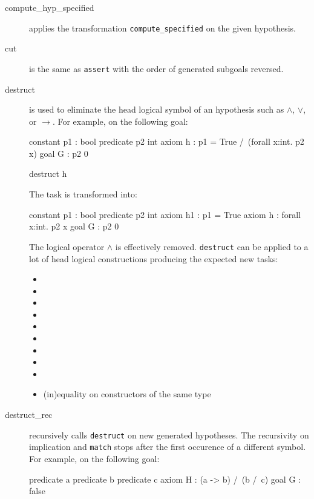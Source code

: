 \begin{description}
\item[compute\_hyp\_specified] applies the transformation
  \texttt{compute\_specified} on the given hypothesis.


\item[cut] is the same as \texttt{assert} with the order of generated subgoals
  reversed.


\item[destruct] is used to eliminate the head logical symbol of an hypothesis
  such as $\wedge$, $\vee$, or $\rightarrow$.
  For example, on the following goal:
\begin{whycode}
constant p1 : bool
predicate p2 int
axiom h : p1 = True /\ (forall x:int. p2 x)
goal G : p2 0
\end{whycode}

\begin{transwhy3}
destruct h
\end{transwhy3}


The task is transformed into:
\begin{whycode}
constant p1 : bool
predicate p2 int
axiom h1 : p1 = True
axiom h : forall x:int. p2 x
goal G : p2 0
\end{whycode}

The logical operator $\wedge$ is effectively removed.
\texttt{destruct} can be applied to a lot of head logical constructions
producing the expected new tasks:
\begin{itemize}
\item {}
\item {}
\item \whyf{/\\}
\item \whyf{\\/}
\item \whyf{->}
\item {}
\item {}
\item {}
\item {}
\item (in)equality on constructors of the same type
\end{itemize}


\item[destruct\_rec] recursively calls \texttt{destruct} on new generated
  hypotheses. The recursivity on implication and \texttt{match} stops after the
  first occurence of a different symbol.
  For example, on the following goal:
\begin{whycode}
predicate a
predicate b
predicate c
axiom H : (a -> b) /\ (b /\ c)
goal G : false
\end{whycode}


\end{description}
